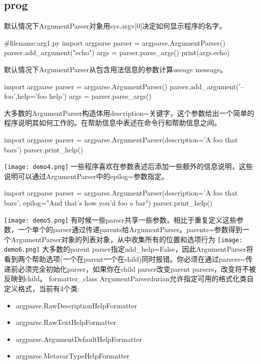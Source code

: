 \subsection{prog}
默认情况下ArgumentParser对象用sys.argv[0]决定如何显示程序的名字。
\begin{python}
#filename:arg1.py
import argparse
parser = argparse.ArgumentParser()
parser.add_argument("echo")
args = parser.parse_args()
print(args.echo)
\end{python}
默认情况下ArgumentParser从包含用法信息的参数计算useage message。
\begin{python}
import argparse
parser = argparse.ArgumentParser()
parser.add_argument('--foo',help='foo help')
args = parser.parse_args()
\end{python}

\begin{figure}[htbp]
\centering
{}
\label{fig:1}
\end{figure}
大多数的ArgumentParser构造体用description=关键字，这个参数给出一个简单的程序说明其如何工作的。在帮助信息中表述在命令行和帮助信息之间。
\begin{python}
import argparse
parser = argparse.ArgumentParser(description='A foo that bars')
parser.print_help()
\end{python}
\texttt{[image: demo4.png]}\newline
一些程序喜欢在参数表述后添加一些额外的信息说明，这些说明可以通过ArgumentParser中的epilog=参数指定。
\begin{python}
import argparse
parser = argparse.ArgumentParser(description='A foo that bars',
epilog="And that's how you'd foo a bar")
parser.print_help()
\end{python}
\texttt{[image: demo5.png]}\newline
有时候一些parser共享一些参数，相比于重复定义这些参数，一个单个的parser通过传递parents给ArgumentParser。parents=参数得到一个ArgumentParser对象的列表对象，从中收集所有的位置和选项行为\newline
\texttt{[image: demo6.png]}\newline
大多数的parent parser指定add\_help=False，因此ArgumentParser将看到两个帮助选项(一个在parent一个在child)同时报错。你必须在通过parsers=传递前必须完全初始化parser，如果你在child parser改变parent parsers，改变将不被反映到child。
formatter\_class
ArgumentParserdurian允许指定可用的格式化类自定义格式，当前有4个类:
\begin{itemize}
\item argparse.RawDescriptionHelpFormatter
\item argparse.RawTextHelpFormatter
\item argparse.ArgumentDefaultHelpFormatter
\item argparse.MetavarTypeHelpFormatter
\end{itemize}

